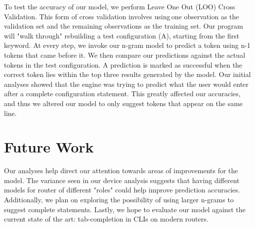 To test the accuracy of our model, we perform Leave One Out (LOO) Cross Validation. This form of cross validation involves using one observation as the validation set and the remaining observations as the training set. Our program will "walk through" rebuilding a test configuration (A), starting from the first keyword. At every step, we invoke our n-gram model to predict a token using n-1 tokens that came before it. We then compare our predictions against the actual tokens in the test configuration. A prediction is marked as successful when the correct token lies within the top three results generated by the model. Our initial analyses showed that the engine was trying to predict what the user would enter after a complete configuration statement. This greatly affected our accuracies, and thus we altered our model to only suggest tokens that appear on the same line.\\

\section{Future Work}

Our analyses help direct our attention towards areas of improvements for the model. The variance seen in our device analysis suggests that having different models for router of different "roles" could help improve prediction accuracies. Additionally, we plan on exploring the possibility of using larger n-grams to suggest complete statements. Lastly, we hope to evaluate our model against the current state of the art: tab-completion in CLIs on modern routers.
